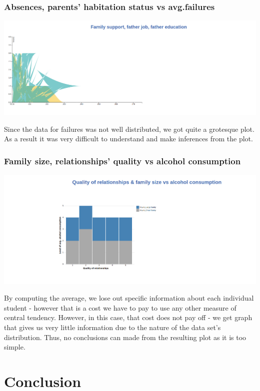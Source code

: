 \documentclass[titlepage, 12pt]{article}
\begin{document}
\subsubsection{Absences, parents' habitation status vs avg.failures}
\begin{center}
\includegraphics[scale=0.2]{5}
\end{center}
Since the data for failures was not well distributed, we got quite a grotesque
plot. As a result it was very difficult to understand and make inferences from
the plot.
\subsubsection{Family size, relationships' quality vs alcohol consumption}
\begin{center}
\includegraphics[scale=0.2]{8}
\end{center}
By computing the average, we lose out specific information about each individual
student - however that is a cost we have to pay to use any other measure of
central tendency. However, in this case, that cost does not pay off - we get
graph that gives us very little information due to the nature of the data set's
distribution. Thus, no conclusions can made from the resulting plot as it is too
simple.




\section{Conclusion}
\end{document}

